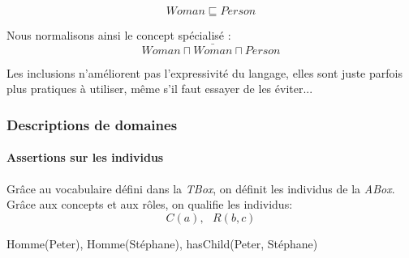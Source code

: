 \begin{exemple}
  \begin{displaymath}
    Woman \sqsubseteq Person
  \end{displaymath}

  Nous normalisons ainsi le concept spécialisé :
  \begin{displaymath}
    Woman \sqcap \bar{Woman} \sqcap Person
  \end{displaymath}
\end{exemple}


\par Les inclusions n'améliorent pas l'expressivité du langage, elles sont juste parfois plus pratiques à utiliser, même s'il faut essayer de les éviter...

\subsubsection{Descriptions de domaines}
\label{sec:descr-de-doma}

\paragraph{Assertions sur les individus}
\label{sec:assertions-sur-les}

\par Grâce au vocabulaire défini dans la \emph{TBox}, on définit les individus de la \emph{ABox}. Grâce aux concepts et aux rôles, on qualifie les individus:
\begin{displaymath}
  C(a), \mbox{ } R(b,c)
\end{displaymath}

\begin{exemple}
  Homme(Peter), Homme(Stéphane), hasChild(Peter, Stéphane)
\end{exemple}

